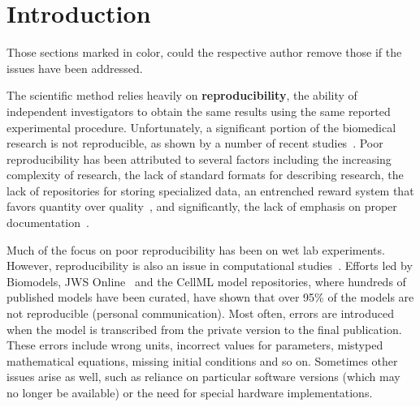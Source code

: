 \documentclass[10pt,letterpaper]{article}
\begin{document}
\linenumbers

\section*{Introduction}



{\color{red}
\noindent
Those sections marked in color, could the respective author remove
those if the issues have been addressed.}
\medskip

The scientific method relies heavily on {\bf reproducibility}, the ability of independent investigators to obtain the same results using the same reported experimental procedure.  Unfortunately, a significant portion of the biomedical research is not reproducible, as shown by a number of recent studies~\cite{prinz2011believe,mobley2013survey}.  Poor reproducibility has been attributed to several factors including the increasing complexity of research, the lack of standard formats for describing research, the lack of repositories for storing specialized data, an entrenched reward system that favors quantity over quality~\cite{quan2017publish}, and significantly, the lack of emphasis on proper documentation~\cite{peng2011reproducible}.

Much of the focus on poor reproducibility has been on wet lab experiments. However, reproducibility is also an issue in computational studies~\cite{peng2016moving,medley2016guidelines,mcdougal2016reproducibility,waltemath2016modeling}.  Efforts led by Biomodels, JWS Online~\cite{olivier2004web} and the CellML model repositories, where hundreds of published models have been curated, have shown that over 95\% of the models are not reproducible (personal communication). Most often, errors are introduced when the model is transcribed from the private version to the final publication.  These errors include wrong units, incorrect values for parameters, mistyped mathematical equations, missing initial conditions and so on. Sometimes other issues arise as well, such as reliance on particular software versions (which may no longer be available) or the need for special hardware implementations.
\end{document}
